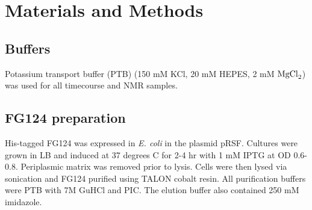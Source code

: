 \section{Materials and Methods}
\subsection{Buffers} Potassium transport buffer (PTB) (150 mM KCl, 20 mM HEPES, 2 mM $\mathrm{MgCl}_2$) was used for all timecourse and NMR samples.
\subsection{FG124 preparation} His-tagged FG124 was expressed in \emph{E. coli} in the plasmid pRSF.  Cultures were grown in LB and  induced at 37 degrees C for 2-4 hr with 1 mM IPTG at OD 0.6-0.8.  Periplasmic matrix was removed prior to lysis.  Cells were then lysed via sonication and FG124 purified using TALON cobalt resin.  All purification buffers were PTB with 7M GuHCl and PIC.  The elution buffer also contained 250 mM imidazole.
